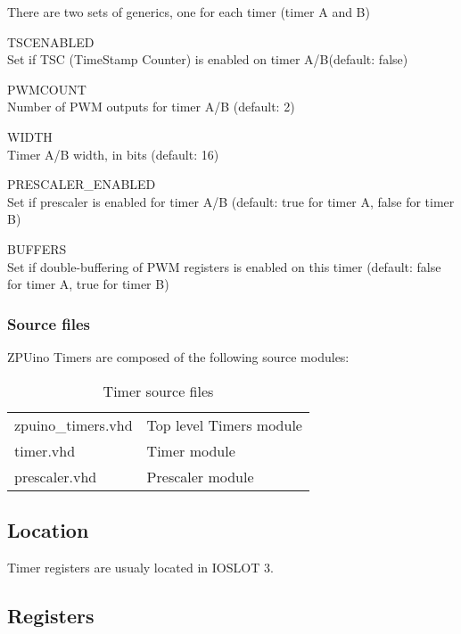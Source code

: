 There are two sets of generics, one for each timer (timer A and B)

\begin{description}
\item{TSCENABLED} \hfill \\ Set if TSC (TimeStamp Counter) is enabled on timer A/B(default: false)
\item{PWMCOUNT} \hfill \\ Number of PWM outputs for timer A/B (default: 2)
\item{WIDTH} \hfill \\ Timer A/B width, in bits (default: 16)
\item{PRESCALER\_ENABLED} \hfill \\ Set if prescaler is enabled for timer A/B (default: true for timer A, false for timer B)
\item{BUFFERS} \hfill \\ Set if double-buffering of PWM registers is enabled on this timer (default: false for timer A, true for timer B)
\end{description}


\subsubsection{Source files}

ZPUino Timers are composed of the following source modules:

\begin{table}[h!]
\begin{center}
\begin{tabularx}{10cm}{ll}

zpuino\_timers.vhd & Top level Timers module \\
timer.vhd & Timer module \\
prescaler.vhd & Prescaler module
\end{tabularx}
\end{center}
\caption{Timer source files}
\end{table}

\subsection{Location}

Timer registers are usualy located in IOSLOT 3.

\subsection{Registers}

